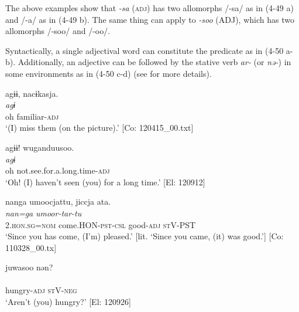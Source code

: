 The above examples show that \textit{{}-sa} (\textsc{adj}) has two allomorphs /-sa/ as in (4-49 a) and /-a/ as in (4-49 b). The same thing can apply to \textit{{}-soo} (ADJ), which has two allomorphs /-soo/ and /-oo/.

Syntactically, a single adjectival word can constitute the predicate as in (4-50 a-b). Additionally, an adjective can be followed by the stative verb \textit{ar-} (or \textit{nə-}) in some environments as in (4-50 c-d) (see  for more details).

\ea  \label{ex:4.50}
\ea  \label{ex:4.50a}%
\glll    agɨɨ,  nacɨkasja.\\
      \textit{agɨ}  \textit{}\\
      oh  familiar-\textsc{adj}\\
      \glt       ‘(I) miss them (on the picture).’ [Co: 120415\_00.txt]

\ex\label{ex:4.50b}%
\glll    agɨɨ!  wuganduusoo.\\
      \textit{agɨ}  \textit{}\\
      oh  not.see.for.a.long.time-\textsc{adj}\\
      \glt       ‘Oh! (I) haven’t seen (you) for a long time.’ [El: 120912]

\ex\label{ex:4.50c}%
\glll    nanga  umoocjattu,  jiccja  ata.\\
      \textit{nan=ga}  \textit{umoor-tar-tu}  \textit{}  \textit{}\\
      2.\textsc{hon}.\textsc{sg}=\textsc{nom}  come.HON-\textsc{pst}-\textsc{csl}  good-\textsc{adj}  \textsc{st}V-PST\\
      \glt       ‘Since you has come, (I’m) pleased.’ [lit. ‘Since you came, (it) was good.’] [Co: 110328\_00.tx]

\ex\label{ex:4.50d}%
\glll    juwasoo  nən?\\
      \textit{}  \textit{}\\
      hungry-\textsc{adj}  \textsc{st}V-\textsc{neg}\\
      \glt       ‘Aren’t (you) hungry?’ [El: 120926]
    \z
\z

